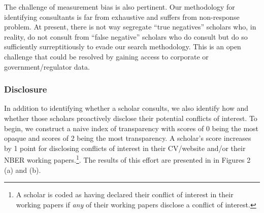 \documentclass[11pt, letterpaper, twoside]{article}
\begin{document}
The challenge of measurement bias is also pertinent. Our methodology for identifying consultants is far from exhaustive and suffers from non-response problem. At present, there is not way segregate ``true negatives'' scholars who, in reality, do not consult from ``false negative'' scholars who do consult but do so sufficiently surreptitiously to evade our search methodology. This is an open challenge that could be resolved by gaining access to corporate or government/regulator data.

\subsubsection{Disclosure}
In addition to identifying whether a scholar consults, we also identify how and whether those scholars proactively disclose their potential conflicts of interest. To begin, we construct a naive index of transparency with scores of 0 being the most opaque and scores of 2 being the most transparency. A scholar's score increases by 1 point for disclosing conflicts of interest in their CV/website and/or their NBER working papers.\footnote{A scholar is coded as having declared their conflict of interest in their working papers if \textit{any} of their working papers disclose a conflict of interest.}. The results of this effort are presented in in Figures 2 (a) and (b).
\end{document}
